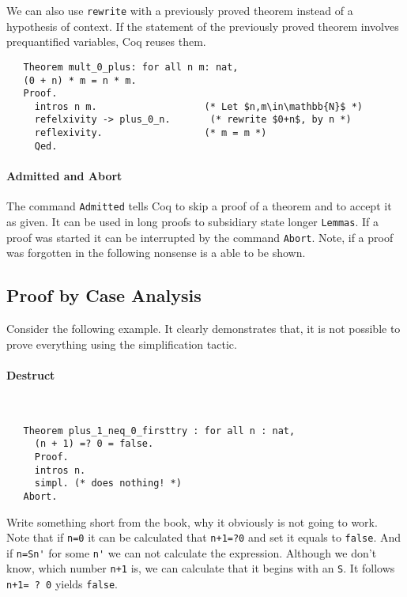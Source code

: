    
   
   
   We can also use \lstinline!rewrite! with a previously proved theorem instead of a hypothesis of context.
   If the statement of the previously proved theorem involves prequantified variables, Coq reuses them.
   
   \begin{lstlisting}
   Theorem mult_0_plus: for all n m: nat,
   (0 + n) * m = n * m.
   Proof.
     intros n m.                   (* Let $n,m\in\mathbb{N}$ *) 
     refelxivity -> plus_0_n.       (* rewrite $0+n$, by n *)
     reflexivity.                  (* m = m *)
     Qed.
   \end{lstlisting}   

	\paragraph{Admitted and Abort}
	
	The command \lstinline!Admitted! tells Coq to skip a proof of a theorem and to accept it as given.
	It can be used in long proofs to subsidiary state longer \lstinline!Lemmas!.
	If a proof was started it can be interrupted by the command \lstinline!Abort!.
	Note, if a proof was forgotten in the following nonsense is a able to be shown. \\
	
	
 \subsection{Proof by Case Analysis}
   Consider the following example. It clearly demonstrates that, it is not possible to prove everything using the simplification tactic.   
   
   
   \paragraph{Destruct}	~\vspace{-5mm}
   \begin{lstlisting}
   Theorem plus_1_neq_0_firsttry : for all n : nat,
     (n + 1) =? 0 = false.
     Proof.
     intros n.
     simpl. (* does nothing! *)
   Abort.
   \end{lstlisting}
	Write something short from the book, why it obviously is not going to work.\\
	
	Note that if \lstinline!n=0! it can be calculated that \lstinline!n+1=?0! and set it equals to  \lstinline!false!. 
	And if \lstinline!n=Sn'! for some \lstinline!n'! we can not calculate the expression.
	Although we don't know, which number \lstinline!n+1! is, we can calculate that it begins with an \lstinline!S!.
	It follows \lstinline!n+1= ? 0! yields \lstinline!false!.
	
